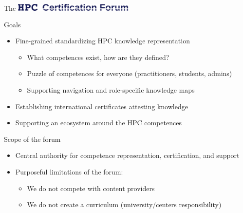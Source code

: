 \documentclass[compress,aspectratio=169]{beamer}
\begin{document}
\begin{frame}{The \includegraphics[width=0.45\textwidth]{hpccf-full}}
		\begin{block}{Goals}
			\begin{itemize}
				\item Fine-grained standardizing HPC knowledge representation
          \begin{itemize}
            \item What competences exist, how are they defined?
            \item Puzzle of competences for everyone (practitioners, students, admins)
            \item Supporting navigation and role-specific knowledge maps
          \end{itemize}
				\item Establishing international certificates attesting knowledge
        \item Supporting an ecosystem around the HPC competences
			\end{itemize}
		\end{block}

    \begin{block}{Scope of the forum}
    \begin{itemize}
      \item Central authority for competence representation, certification, and support
      \item Purposeful limitations of the forum:
			\begin{itemize}
				\item We do not compete with content providers
				\item We do not create a curriculum (university/centers responsibility)
			\end{itemize}
    \end{itemize}
		\end{block}
\end{frame}
\end{document}
